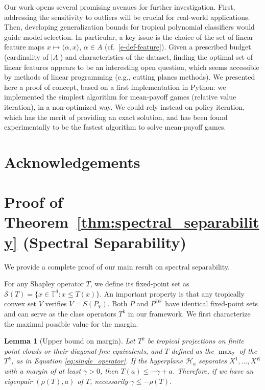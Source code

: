 \documentclass{article}
\newtheorem{lemma}[theorem]{Lemma}
\renewcommand{\leq}{\leqslant}
\newcommand{\trop}{\mathbb{T}}
\def\<#1,#2>{\langle #1,#2\rangle}
\begin{document}
Our work opens several promising avenues for further investigation. First, addressing the sensitivity to outliers will be crucial for real-world applications. Then, developing generalization bounds for tropical polynomial classifiers would guide model selection. In particular, a key issue is the choice of the set of linear feature maps $x\mapsto \<\alpha,x>$, $\alpha\in A$ (cf.\ \eqref{e-def-feature}). Given a prescribed budget (cardinality of $|A|$) and characteristics
of the dataset, finding the optimal set of linear features
appears to be an interesting open question, which seems accessible
by methods of linear programming (e.g., cutting planes methods).
We presented here a proof of concept, based on a first implementation in Python: we implemented the simplest algorithm for mean-payoff games
(relative value iteration), in a non-optimized way. We could rely instead on policy iteration, which has the merit of providing an exact solution, and
has been found experimentally to be the fastest algorithm to solve mean-payoff
games.

\section*{Acknowledgements}




\newpage
\appendix
\section{Proof of Theorem~\ref{thm:spectral_separability} (Spectral Separability)}\label{appendix:proofs}
We provide a complete proof of our main result on spectral separability.

For any Shapley operator $T$, we define its fixed-point set as $\mathcal{S}(T) = \{x \in \trop^d : x \leq T(x)\}$. An important property is that any tropically convex set $V$ verifies $V = S(P_V)$.
Both $P$ and $P^\text{DF}$ have identical fixed-point sets and can serve as the class operators $T^k$ in our framework. We first characterize the maximal possible value for the margin.

\begin{lemma}[Upper bound on margin]\label{lemma:hyperplane_to_operator}
Let $T^k$ be tropical projections on finite point clouds or their diagonal-free equivalents, and $T$ defined as the $\operatorname{\max}_2$ of the $T^k$, as in Equation \ref{eq:single_operator}.
If the hyperplane $\mathcal{H}_a$ separates $X^1,\ldots,X^K$ with a margin of at least $\gamma > 0$, then $T(a) \leq -\gamma + a$.
Therefore, if we have an eigenpair $(\rho(T),a)$ of $T$, necessarily $\gamma \le -\rho(T)$.
\end{lemma}
\end{document}
